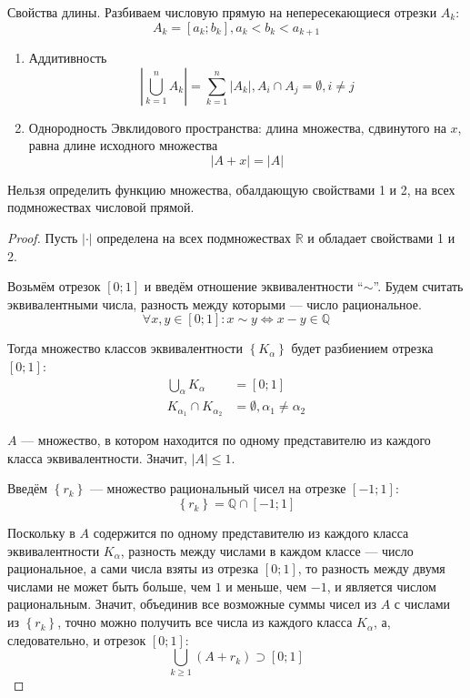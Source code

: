 Свойства длины. Разбиваем числовую прямую на непересекающиеся отрезки $A_k$:
        $$A_k=\left[a_k;b_k\right], a_k < b_k < a_{k+1}$$
\begin{enumerate}
    \item Аддитивность
        $$\left|\bigcup_{k=1}^n A_k\right|=\sum_{k=1}^n\left|A_k\right| , A_i\cap A_j=\emptyset, i\neq j$$
    \item Однородность Эвклидового пространства: длина множества, сдвинутого на $x$, равна длине исходного множества
        $$\left|A+x\right|=\left|A\right|$$
\end{enumerate}
\begin{affirmation}
    Нельзя определить функцию множества, обалдающую свойствами 1 и 2,
    на всех подмножествах числовой прямой.
\end{affirmation}
\begin{proof}
    Пусть $\left|\cdot\right|$ определена на всех подмножествах $\mathbb{R}$ и
    обладает свойствами 1 и 2.

    Возьмём отрезок $\left[0;1\right]$ и введём
    отношение эквивалентности ``$\sim$''.
    Будем считать эквивалентными числа,
    разность между которыми --- число рациональное.
    $$\forall x,y\in\left[0;1\right]: x\sim y
    \Leftrightarrow x-y\in\mathbb{Q}$$

    Тогда множество классов эквивалентности $\left\{K_{\alpha}\right\}$
    будет разбиением отрезка $\left[0;1\right]$:
    \begin{align*}
        \bigcup_{\alpha} K_{\alpha}&=\left[0;1\right]\\
        K_{\alpha_1} \cap K_{\alpha_2}&=\emptyset,\alpha_1\neq\alpha_2
    \end{align*}

    $A$ --- множество, в котором находится по одному представителю
    из каждого класса эквивалентности. Значит, $\left|A\right|\le 1$.

    Введём $\left\{r_k\right\}$ --- множество рациональный чисел
    на отрезке $\left[-1;1\right]$:
    $$\left\{r_k\right\}=\mathbb{Q} \cap \left[-1;1\right]$$

    Поскольку в $A$ содержится по одному представителю
    из каждого класса эквивалентности $K_{\alpha}$,
    разность между числами в каждом классе --- число рациональное,
    а сами числа взяты из отрезка $\left[0;1\right]$,
    то разность между двумя числами не может быть
    больше, чем $1$ и меньше, чем $-1$, и является числом рациональным.
    Значит, объединив все возможные суммы
    чисел из $A$ с числами из $\left\{r_k\right\}$,
    точно можно получить все числа из каждого класса $K_{\alpha}$,
    а, следовательно, и отрезок $\left[0;1\right]$:
    $$\bigcup_{k\ge 1} \left(A+r_k\right) \supset \left[0;1\right]$$


\end{proof}
